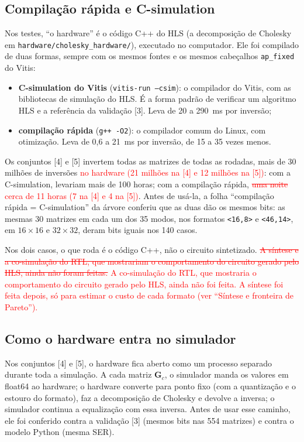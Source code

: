 \documentclass[11pt]{article}
\newcommand{\novo}[1]{\textcolor{red}{#1}}
\newcommand{\velho}[1]{\textcolor{red}{\sout{#1}}}
\begin{document}
\subsection*{Compilação rápida e C-simulation}

Nos testes, ``o hardware'' é o código C++ do HLS (a decomposição de Cholesky em
\texttt{hardware/cholesky\_hardware/}), executado no computador. Ele foi compilado de duas
formas, sempre com os mesmos fontes e os mesmos cabeçalhos \texttt{ap\_fixed} do Vitis:
\begin{itemize}
  \item \textbf{C-simulation do Vitis} (\texttt{vitis-run --csim}): o compilador do Vitis, com as
        bibliotecas de simulação do HLS. É a forma padrão de verificar um algoritmo HLS e a
        referência da validação [3]. Leva de 20 a 290~ms por inversão;
  \item \textbf{compilação rápida} (\texttt{g++ -O2}): o compilador comum do Linux, com otimização.
        Leva de 0,6 a 21~ms por inversão, de 15 a 35 vezes menos.
\end{itemize}
Os conjuntos [4] e [5] invertem todas as matrizes de todas as rodadas, mais de 30 milhões de
inversões\novo{ no hardware (21 milhões na [4] e 12 milhões na [5])}: com a C-simulation, levariam mais de 100 horas; com a compilação rápida, \velho{uma noite}
\novo{cerca de 11 horas (7 na [4] e 4 na [5])}.
Antes de usá-la, a folha ``compilação rápida = C-simulation'' da árvore conferiu que as duas dão
os mesmos bits: as mesmas 30 matrizes em cada um dos 35 modos, nos formatos \texttt{<16,8>} e
\texttt{<46,14>}, em $16 \times 16$ e $32 \times 32$, deram bits iguais nos 140 casos.

Nos dois casos, o que roda é o código C++, não o circuito sintetizado. \velho{A síntese e a
co-simulação do RTL, que mostrariam o comportamento do circuito gerado pelo HLS, ainda não
foram feitas.} \novo{A co-simulação do RTL, que mostraria o comportamento do circuito gerado pelo
HLS, ainda não foi feita. A síntese foi feita depois, só para estimar o custo de cada formato
(ver ``Síntese e fronteira de Pareto'').}

\subsection*{Como o hardware entra no simulador}

Nos conjuntos [4] e [5], o hardware fica aberto como um processo separado durante toda a
simulação. A cada matriz $\mathbf G_c$, o simulador manda os valores em float64 ao hardware;
o hardware converte para ponto fixo (com a quantização e o estouro do formato), faz a
decomposição de Cholesky e devolve a inversa; o simulador continua a equalização com essa
inversa. Antes de usar esse caminho, ele foi conferido contra a validação [3] (mesmos bits nas
554 matrizes) e contra o modelo Python (mesma SER).
\end{document}
